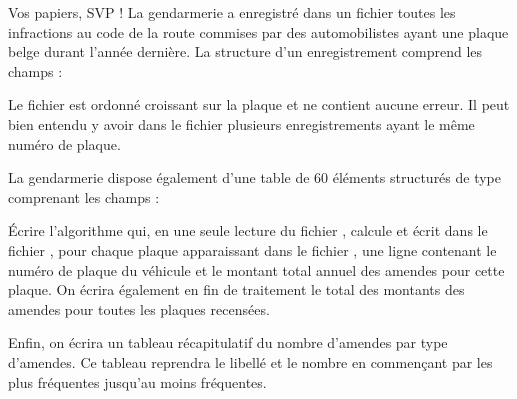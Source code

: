 \begin{Exercice}{Vos papiers, SVP !}
	La gendarmerie a enregistré dans un fichier  toutes les infractions au
	code de la route commises par des automobilistes ayant une plaque belge
	durant l’année dernière. La structure  d’un
	enregistrement comprend les champs :


	Le fichier est ordonné croissant sur la plaque et ne contient aucune
	erreur. Il peut bien entendu y avoir dans le fichier plusieurs
	enregistrements ayant le même numéro de plaque.

	La gendarmerie dispose également d’une table 
	de 60 éléments structurés de type  comprenant les champs :


	Écrire l’algorithme qui, en une seule lecture du fichier , calcule et
	écrit dans le fichier , pour chaque plaque apparaissant dans le
	fichier , une ligne contenant le numéro de plaque du véhicule et le
	montant total annuel des amendes pour cette plaque. On écrira également
	en fin de traitement le total des montants des amendes pour toutes les
	plaques recensées.

	Enfin, on écrira un tableau récapitulatif du nombre d’amendes par type
	d’amendes. Ce tableau reprendra le libellé et le nombre en commençant
	par les plus fréquentes jusqu’au moins fréquentes. 
\end{Exercice}

